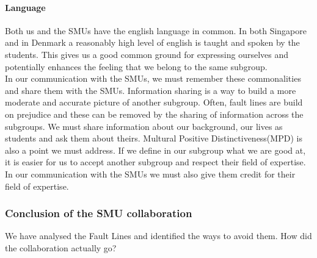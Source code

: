 \documentclass[a4paper,11pt,report]{article}
\begin{document}
\paragraph{Language}
Both us and the SMUs have the english language in common. In both Singapore and in Denmark a reasonably high level of english is taught and spoken by the students. This gives us a good common ground for expressing ourselves and potentially enhances the feeling that we belong to the same subgroup. \\

In our communication with the SMUs, we must remember these commonalities and share them with the SMUs. Information sharing\cite{smu} is a way to build a more moderate and accurate picture of another subgroup. Often, fault lines are build on prejudice and these can be removed by the sharing of information across the subgroups. We must share information about our background, our lives as students and ask them about theirs. Multural Positive Distinctiveness(MPD)\cite{smu} is also a point we must address. If we define in our subgroup what we are good at, it is easier for us to accept another subgroup and respect their field of expertise. In our communication with the SMUs we must also give them credit for their field of expertise. \\

\subsubsection{Conclusion of the SMU collaboration}

We have analysed the Fault Lines and identified the ways to avoid them. How did the collaboration actually go? \\
\end{document}
